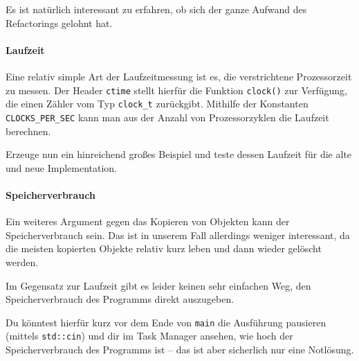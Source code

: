 Es ist natürlich interessant zu erfahren, ob sich der ganze Aufwand des Refactorings gelohnt hat.

\paragraph{Laufzeit}
Eine relativ simple Art der Laufzeitmessung ist es, die verstrichtene Prozessorzeit zu messen.
Der Header \texttt{ctime} stellt hierfür die Funktion \texttt{clock()} zur Verfügung, die einen Zähler vom Typ \texttt{clock\_t} zurückgibt.
Mithilfe der Konstanten \texttt{CLOCKS\_PER\_SEC} kann man aus der Anzahl von Prozessorzyklen die Laufzeit berechnen.

Erzeuge nun ein hinreichend großes Beispiel und teste dessen Laufzeit für die alte und neue Implementation.



\paragraph{Speicherverbrauch}
Ein weiteres Argument gegen das Kopieren von Objekten kann der Speicherverbrauch sein.
Das ist in unserem Fall allerdings weniger interessant, da die meisten kopierten Objekte relativ kurz leben und dann wieder gelöscht werden.

Im Gegensatz zur Laufzeit gibt es leider keinen sehr einfachen Weg, den Speicherverbrauch des Programms direkt auszugeben.

Du könntest hierfür kurz vor dem Ende von \texttt{main} die Ausführung pausieren (mittels \texttt{std::cin}) und dir im Task Manager ansehen, wie hoch der Speicherverbrauch des Programms ist -- das ist aber sicherlich nur eine Notlösung.




